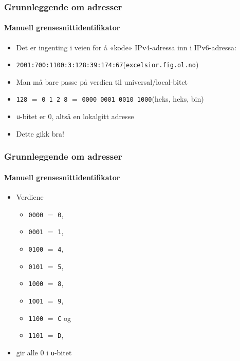 \begin{frame}%
  \frametitle{Grunnleggende om adresser}
  \framesubtitle{Manuell grensesnittidentifikator}
  \begin{itemize}[<+->]
  \item Det er ingenting i veien for å «kode» IPv4-adressa inn i
    IPv6-adressa:
  \item \texttt{2001:700:1100:3:\alert{128:39:174:67}}\hfill(\texttt{excelsior.fig.ol.no})
  \item Man må bare passe på verdien til universal/local-bitet
  \item \texttt{128} $=$ \texttt{0 1 2 8} $=$ \texttt{0000 00\alert{0}1 0010 1000}\hfill(heks, heks, bin)
  \item \texttt{u}-bitet er $0$, altså en lokalgitt adresse
  \item Dette gikk bra!
  \end{itemize}
\end{frame}

\begin{frame}%
  \frametitle{Grunnleggende om adresser}
  \framesubtitle{Manuell grensesnittidentifikator}
  \begin{itemize}[<+->]
  \item Verdiene
    \begin{itemize}[<+->]
    \item \texttt{00\alert{0}0} $=$ \texttt{0},
    \item \texttt{00\alert{0}1} $=$ \texttt{1},
    \item \texttt{01\alert{0}0} $=$ \texttt{4},
    \item \texttt{01\alert{0}1} $=$ \texttt{5},
    \item \texttt{10\alert{0}0} $=$ \texttt{8},
    \item \texttt{10\alert{0}1} $=$ \texttt{9},
    \item \texttt{11\alert{0}0} $=$ \texttt{C} og
    \item \texttt{11\alert{0}1} $=$ \texttt{D},
    \end{itemize}
  \item gir alle $0$ i \texttt{u}-bitet
  \end{itemize}
\end{frame}

